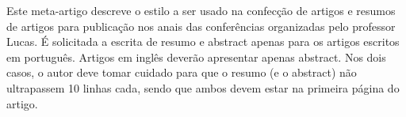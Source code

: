 \begin{resumo} 
  Este meta-artigo descreve o estilo a ser usado na confecção de artigos e  resumos de artigos para publicação nos anais das conferências organizadas pelo professor Lucas. É solicitada a escrita de resumo e abstract apenas para os artigos escritos em português. Artigos em inglês deverão apresentar apenas abstract. Nos dois casos, o autor deve tomar cuidado para que o resumo (e o abstract) não ultrapassem 10 linhas cada, sendo que ambos devem estar na primeira página do artigo.
\end{resumo}